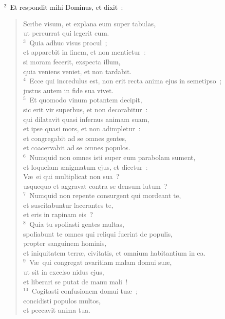 ${}^{2}$~Et respondit mihi Dominus, et dixit~: \begin{verse}Scribe visum, et explana eum super tabulas,\\ ut percurrat qui legerit eum.\\
${}^{3}$~Quia adhuc visus procul~;\\ et apparebit in finem, et non mentietur~:\\ si moram fecerit, exspecta illum,\\ quia veniens veniet, et non tardabit.\\
${}^{4}$~Ecce qui incredulus est, non erit recta anima ejus in semetipso~;\\ justus autem in fide sua vivet.\\
${}^{5}$~Et quomodo vinum potantem decipit,\\ sic erit vir superbus, et non decorabitur~:\\ qui dilatavit quasi infernus animam suam,\\ et ipse quasi mors, et non adimpletur~:\\ et congregabit ad se omnes gentes,\\ et coacervabit ad se omnes populos.\\
${}^{6}$~Numquid non omnes isti super eum parabolam sument,\\ et loquelam \ae nigmatum ejus, et dicetur~:\\ V\ae\ ei qui multiplicat non sua~?\\ usquequo et aggravat contra se densum lutum~?\\
${}^{7}$~Numquid non repente consurgent qui mordeant te,\\ et suscitabuntur lacerantes te,\\ et eris in rapinam eis~?\\
${}^{8}$~Quia tu spoliasti gentes multas,\\ spoliabunt te omnes qui reliqui fuerint de populis,\\ propter sanguinem hominis,\\ et iniquitatem terr\ae , civitatis, et omnium habitantium in ea.\\
${}^{9}$~V\ae\ qui congregat avaritiam malam domui su\ae ,\\ ut sit in excelso nidus ejus,\\ et liberari se putat de manu mali~!\\
${}^{10}$~Cogitasti confusionem domui tu\ae~;\\ concidisti populos multos,\\ et peccavit anima tua.\\

\end{verse}
